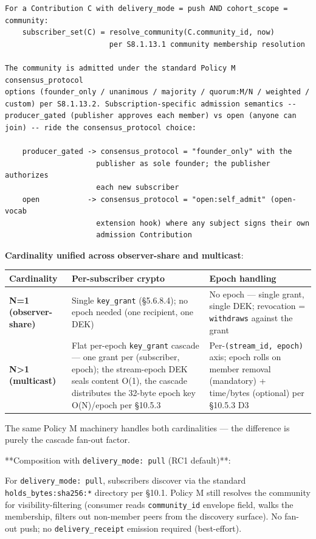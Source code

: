 \documentclass[11pt]{article}
\begin{document}
\begin{lstlisting}
For a Contribution C with delivery_mode = push AND cohort_scope = community:
    subscriber_set(C) = resolve_community(C.community_id, now)
                        per S8.1.13.1 community membership resolution

The community is admitted under the standard Policy M consensus_protocol
options (founder_only / unanimous / majority / quorum:M/N / weighted /
custom) per S8.1.13.2. Subscription-specific admission semantics --
producer_gated (publisher approves each member) vs open (anyone can
join) -- ride the consensus_protocol choice:

    producer_gated -> consensus_protocol = "founder_only" with the
                     publisher as sole founder; the publisher authorizes
                     each new subscriber
    open           -> consensus_protocol = "open:self_admit" (open-vocab
                     extension hook) where any subject signs their own
                     admission Contribution
\end{lstlisting}

\textbf{Cardinality unified across observer-share and multicast}:


{\footnotesize
\begin{longtable}{|p{5.33cm}|p{5.33cm}|p{5.33cm}|}\hline
\textbf{Cardinality} & \textbf{Per-subscriber crypto} & \textbf{Epoch handling} \\ \hline\endhead
\textbf{N=1 (observer-share)} & Single \texttt{key\_grant} (§5.6.8.4); no epoch needed (one recipient, one DEK) & No epoch — single grant, single DEK; revocation = \texttt{withdraws} against the grant \\ \hline
\textbf{N>1 (multicast)} & Flat per-epoch \texttt{key\_grant} cascade — one grant per (subscriber, epoch); the stream-epoch DEK seals content O(1), the cascade distributes the 32-byte epoch key O(N)/epoch per §10.5.3 & Per-\texttt{(stream\_id, epoch)} axis; epoch rolls on member removal (mandatory) + time/bytes (optional) per §10.5.3 D3 \\ \hline
\end{longtable}}


The same Policy M machinery handles both cardinalities — the difference is purely the cascade fan-out factor.


**Composition with \texttt{delivery\_mode: pull} (RC1 default)**:


For \texttt{delivery\_mode: pull}, subscribers discover via the standard \texttt{holds\_bytes:sha256:*} directory per §10.1. Policy M still resolves the community for visibility-filtering (consumer reads \texttt{community\_id} envelope field, walks the membership, filters out non-member peers from the discovery surface). No fan-out push; no \texttt{delivery\_receipt} emission required (best-effort).
\end{document}
